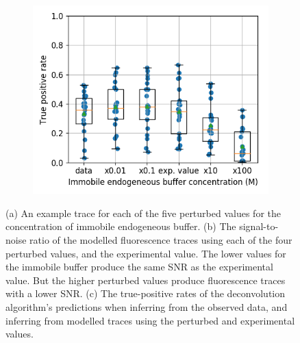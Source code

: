 \documentclass[a4paper,12pt]{article}
\theoremstyle{definition}
\begin{document}
\begin{figure}
\begin{subfigure}{0.5\textwidth}
        \includegraphics[width=\linewidth]{figures/immobile_perturbed_oasis_first_paper.png}
        \caption{}
    \end{subfigure}
    \caption{(a) An example trace for each of the five perturbed values for the concentration of immobile endogeneous buffer.	(b) The signal-to-noise ratio of the modelled fluorescence traces using each of the four perturbed values, and the experimental value. The lower values for the immobile buffer produce the same SNR as the experimental value. But the higher perturbed values produce fluorescence traces with a lower SNR.	(c) The true-positive rates of the deconvolution algorithm's predictions when inferring from the observed data, and inferring from modelled traces using the perturbed and experimental values.}
    \label{fig:endogeneous_perturbed}
\end{figure}
\end{document}
